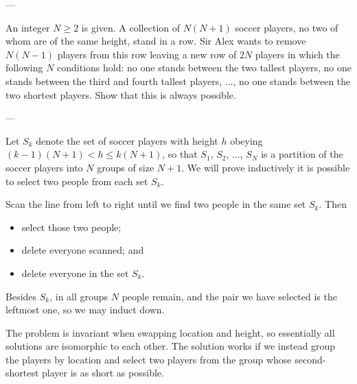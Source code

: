 
---

An integer $N\ge2$ is given. A collection of $N(N+1)$ soccer players, no two of whom are of the same height, stand in a row. Sir Alex wants to remove $N(N-1)$ players from this row leaving a new row of $2N$ players in which the following $N$ conditions hold: no one stands between the two tallest players, no one stands between the third and fourth tallest players, $\ldots$, no one stands between the two shortest players. Show that this is always possible.

---

Let $S_k$ denote the set of soccer players with height $h$ obeying $(k-1)(N+1)<h\le k(N+1)$, so that $S_1$, $S_2$, $\ldots$, $S_N$ is a partition of the soccer players into $N$ groups of size $N+1$. We will prove inductively it is possible to select two people from each set $S_k$.

Scan the line from left to right until we find two people in the same set $S_k$. Then
\begin{itemize}[itemsep=0em]
\item select those two people;
\item delete everyone scanned; and
\item delete everyone in the set $S_k$.
\end{itemize}
Besides $S_k$, in all groups $N$ people remain, and the pair we have selected is the leftmost one, so we may induct down.
\begin{boxremark}
    The problem is invariant when swapping location and height, so essentially all solutions are isomorphic to each other. The solution works if we instead group the players by location and select two players from the group whose second-shortest player is as short as possible.
\end{boxremark}



